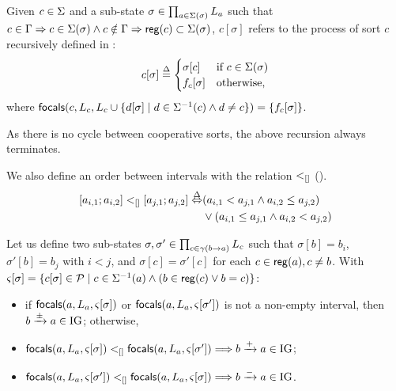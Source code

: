 
Given $c\in\Sigma$ and a sub-state $\sigma\in\prod_{a\in\Sigma(\sigma)} L_a$
such that $c\in\Gamma\Rightarrow c\in\Sigma(\sigma) \wedge
c\notin\Gamma\Rightarrow \mathsf{reg}({c})\subset\Sigma(\sigma)$,
$c[\sigma]$ refers to the process of sort $c$ recursively defined in :
\begin{equation}
c[\sigma] \stackrel{\Delta}=
\begin{cases}
\sigma[c] & \text{if } c\in\Sigma(\sigma) \\
f_{c}[\sigma] & \text{otherwise,}
\end{cases}
\label{eq:proc-ctx}
\end{equation}
where
$\mathsf{focals}(c, L_c, L_c \cup \{ d[\sigma] \mid d\in\Sigma^{-1}(c) \wedge d\neq c \})
	= \{ f_c[\sigma] \}$.

As there is no cycle between cooperative sorts, the above recursion always terminates.


We also define an order between intervals with the relation $<_{[]}$
().
\begin{align}
\begin{split}
  [a_{i,1} ; a_{i,2}] <_{[]} [a_{j,1} ; a_{j,2}] \stackrel{\Delta}\Leftrightarrow & (a_{i,1} < a_{j,1} \wedge a_{i,2}
  \leq a_{j,2}) \\
  &\vee (a_{i,1} \leq a_{j,1} \wedge a_{i,2} < a_{j,2})
\end{split}
\label{eq:interval-compare}
\end{align}

Let us define two sub-states $\sigma,\sigma'\in \prod_{c\in\gamma(b\rightarrow a)} L_c$ such that
$\sigma[b]=b_i$, $\sigma'[b]=b_j$ with $i < j$,
and $\sigma[c]=\sigma'[c]$ for each $c\in\mathsf{reg}({a}), c\neq b$.
With $\varsigma[\sigma] = \{ c[\sigma] \in \mathcal{P} \mid c\in\Sigma^{-1}(a) \wedge 
	(b\in \mathsf{reg}({c}) \vee b = c)
\}$:
\begin{itemize}
\item if $\mathsf{focals}(a,L_a,\varsigma[\sigma])$ or $\mathsf{focals}(a,L_a,\varsigma[\sigma'])$ is not a non-empty interval, then
			$b\xrightarrow{\pm}a\in \mathrm{IG}$; otherwise,
\item $\mathsf{focals}(a,L_a,\varsigma[\sigma]) <_{[]} \mathsf{focals}(a,L_a,\varsigma[\sigma']) \Longrightarrow
			b\xrightarrow{+}a\in \mathrm{IG}$;
\item $\mathsf{focals}(a,L_a,\varsigma[\sigma']) <_{[]} \mathsf{focals}(a,L_a,\varsigma[\sigma]) \Longrightarrow
			b\xrightarrow{-}a\in \mathrm{IG}$.
\end{itemize}

